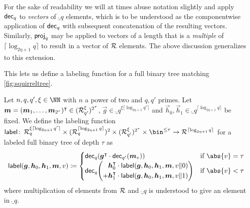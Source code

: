 %
For the sake of readability we will at times abuse notation slightly and apply $\mathsf{dec}_q$ to \emph{vectors} of $\ring_q$ elements, which is to be understood as the componentwise application of $\mathsf{dec}_q$ with subsequent concatenation of the resulting vectors.
Similarly, $\mathsf{proj}_q$ may be applied to vectors of a length that is a \emph{multiple} of $\lceil\log_{2\eta+1} q\rceil$ to result in a vector of $\mathcal{R}$ elements.
The above discussion generalizes to this extension.

This lets us define a labeling function for a full binary tree matching \autoref{fig:squirreltree}.

\begin{definition}\label{def:label}
  Let $n,q,q',\xi\in\NN$ with $n$ a power of two and $q,q'$ primes.
  Let $\boldsymbol{m}=(\boldsymbol{m}_{1},\dots,\boldsymbol{m}_{{2^{\tau}}})^\intercal\in(\mathcal{R}_{q'}^\xi)^{2^{\tau}}$, $\vec{g} \in \ring_{q}^{\xi\lceil\log_{2\eta+1} q'\rceil}$ and $\vec{h}_0,\vec{h}_1 \in \ring_q^{\lceil\log_{2\eta+1} q\rceil}$ be fixed.
  We define the labeling function
  $\lbl\colon\,\ring_{q}^{\xi\lceil\log_{2\eta+1} q'\rceil} \times (\ring_q^{\lceil\log_{2\eta+1} q\rceil})^2 \times (\ring^\xi_{q'})^{2^{\tau}}\times \bin^{\leq \tau} \to \ring^{\lceil \log_{2\eta+1} q \rceil}$
  for a labeled full binary tree of depth $\tau$ as
  \[
    \lbl(\vec{g}, \vec{h}_0,\vec{h}_1,\vec{m},v) \coloneqq 
      \begin{cases}
          \decomp_{q}(\vec{g}^\transpose\cdot \decomp_{q'}(\vec{m}_{v})) & \text{if } \abs{v}=\tau\\ \decomp_q\mleft(
              \begin{aligned}\vec{h}_0^\transpose \cdot\lbl(\vec{g},\vec{h}_0,\vec{h}_1,\vec{m},v\Vert 0)\\ + \vec{h}_1^\transpose \cdot\lbl(\vec{g},\vec{h}_0,\vec{h}_1,\vec{m},v\Vert 1)\end{aligned}
              \mright)& \text{if } \abs{v}< \tau
      \end{cases}
  \]
  where multiplication of elements from $\mathcal{R}$ and $\ring_q$ is understood to give an element in $\ring_q$.
\end{definition}

